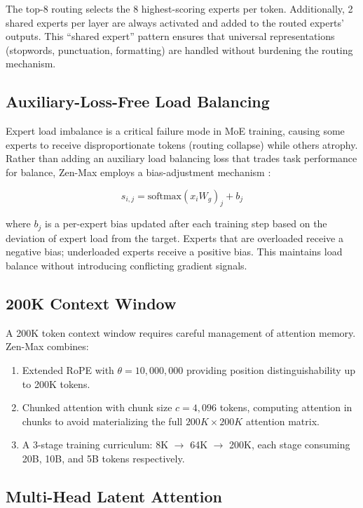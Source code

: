 \documentclass[11pt,a4paper]{article}
\begin{document}
The top-8 routing selects the 8 highest-scoring experts per token. Additionally, 2 shared
experts per layer are always activated and added to the routed experts' outputs. This
``shared expert'' pattern ensures that universal representations (stopwords, punctuation,
formatting) are handled without burdening the routing mechanism.

\subsection{Auxiliary-Loss-Free Load Balancing}

Expert load imbalance is a critical failure mode in MoE training, causing some experts to
receive disproportionate tokens (routing collapse) while others atrophy. Rather than adding
an auxiliary load balancing loss that trades task performance for balance, Zen-Max employs
a bias-adjustment mechanism \cite{deepseekmoe2024}:

\begin{equation}
  s_{i,j} = \text{softmax}(x_i W_g)_j + b_j
\end{equation}

where $b_j$ is a per-expert bias updated after each training step based on the deviation of
expert load from the target. Experts that are overloaded receive a negative bias; underloaded
experts receive a positive bias. This maintains load balance without introducing conflicting
gradient signals.

\subsection{200K Context Window}

A 200K token context window requires careful management of attention memory. Zen-Max combines:

\begin{enumerate}
  \item Extended RoPE with $\theta = 10{,}000{,}000$ providing position distinguishability
        up to 200K tokens.
  \item Chunked attention with chunk size $c = 4{,}096$ tokens, computing attention in chunks
        to avoid materializing the full $200K \times 200K$ attention matrix.
  \item A 3-stage training curriculum: 8K $\to$ 64K $\to$ 200K, each stage consuming
        20B, 10B, and 5B tokens respectively.
\end{enumerate}

\subsection{Multi-Head Latent Attention}
\end{document}
